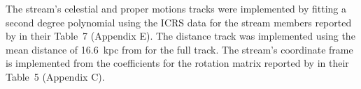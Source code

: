 The stream's celestial and proper motions tracks were implemented by fitting a second degree polynomial using the ICRS data for the stream members reported by \citet{Shipp2019} in their Table~7 (Appendix E). The distance track was implemented using the mean distance of 16.6~kpc from \citet{Shipp2018} for the full track. The stream's coordinate frame is implemented from the coefficients for the rotation matrix reported by \citet{Shipp2019} in their Table~5 (Appendix C).

